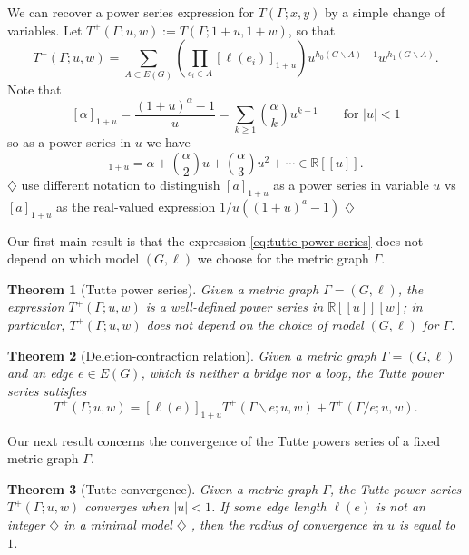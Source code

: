 \documentclass{amsart}
\newtheorem{thm}{Theorem}
\theoremstyle{definition}
\newcommand{\RR}{\mathbb{R}}
\newcommand{\harry}[1]{{\color{red} \sf $\diamondsuit$  {#1} $\diamondsuit$ }}
\newcommand{\note}[1]{\harry{#1}}
\begin{document}
We can recover a power series expression for $T(\Gamma; x,y)$ by a simple change of variables.
Let
$T^+(\Gamma; u,w) := T(\Gamma; 1 + u, 1 + w) $,
so that
\begin{equation}
\label{eq:tutte-power-series}
T^+(\Gamma; u,w) = \sum_{A \subset E(G)} \left( \prod_{e_i \in A} [\ell(e_i)]_{1+u} \right)
u^{h_0(G\backslash A) - 1}w^{h_1(G\backslash A)} .
\end{equation}
Note that
\[ [\alpha]_{1+u} = \frac{(1+u)^\alpha - 1}{u}
= \sum_{k \geq 1} \binom{\alpha}{k}u^{k-1} 
\qquad \text{for } |u|<1
\]
so as a power series in $u$ we have 
\begin{equation}
[\alpha]_{1+u} = \alpha + \binom{\alpha}{2} u + \binom{\alpha}{3} u^2 + \cdots
\in \RR[[u]] .
\end{equation}
\note{use different notation to distinguish $[a]_{1+u}$ as a power series in variable $u$ 
vs $[a]_{1+u}$ as the real-valued expression $1/u((1+u)^a-1)$}

Our first main result is that the expression \eqref{eq:tutte-power-series} does not depend on which  model $(G,\ell)$ we choose for the metric graph $\Gamma$.
\begin{thm}[Tutte power series]
\label{thm:tutte-series}
Given a metric graph $\Gamma = (G,\ell)$,
the expression $T^+(\Gamma; u,w)$
is a well-defined power series in
$\RR[[u]][w]$;
in particular,
$T^+(\Gamma; u,w)$ does not depend on the choice of model $(G,\ell)$ for $\Gamma$.
\end{thm}

\begin{thm}[Deletion-contraction relation]
\label{thm:deletion-contraction}
Given a metric graph $\Gamma = (G,\ell)$ and an edge $e \in E(G)$,
which is neither a bridge nor a loop,
the Tutte power series satisfies
\begin{equation*}
T^+(\Gamma; u,w) = [\ell(e)]_{1+u} T^+(\Gamma \backslash e; u,w) + T^+(\Gamma / e; u,w).
\end{equation*}
\end{thm}

Our next result concerns the convergence of the Tutte powers series of a fixed metric graph $\Gamma$.
\begin{thm}[Tutte convergence]
\label{thm:tutte-convergence}
Given a metric graph $\Gamma$,
the Tutte power series $T^+(\Gamma;u,w)$ converges when $|u|<1$.
If some edge length $\ell(e)$ is not an integer \note{in a minimal model},
then the radius of convergence in $u$ is equal to $1$.
\end{thm}
\end{document}
